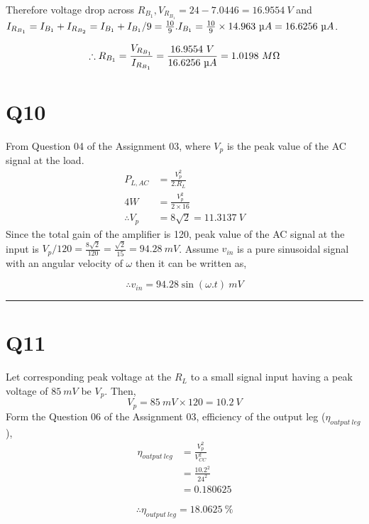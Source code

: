 \documentclass[legalpaper,11pt]{article}%
\begin{document}
Therefore voltage drop across $R_{B_1}, V_{R_{B_1}} = 24- 7.0446 = 16.9554~V$ and
 $I_{R_{B_1}} = I_{B_1}+I_{R_{B_2}} = I_{B_1}+I_{B_1}/9 = \frac{10}{9}.I_{B_1} = \frac{10}{9}\times14.963 ~\micro A = 16.6256~\micro A$.

\[\therefore R_{B_1} = \frac{V_{R_{B_1}}}{I_{R_{B_1}}} = \frac{16.9554~V}{16.6256~\micro A} =1.0198 ~M\Omega \]%


\section*{Q10}

From Question 04 of the Assignment 03, where $V_p$ is the peak value of the AC signal at the load.
\[
\begin{split}
	P_{L,AC} & =  \frac{V_p^2}{2.R_L}\\
	4 W & = \frac{V_p^2}{2\times 16}\\	
	\therefore V_p& = 8\sqrt{2} = 11.3137~ V
\end{split}
\]
Since the total gain of the amplifier is 120, peak value of the AC signal at the input is $V_p/120 = \frac{8\sqrt{2}}{120} = \frac{\sqrt{2}}{15} = 94.28~mV$. Assume $v_{in}$ is a pure sinusoidal signal with an angular velocity of $\omega$ then it can be written as,

\[ \therefore v_{in} = 94.28\sin\left(\omega.t\right)~mV \]

\hrule
\section*{Q11}
Let corresponding peak voltage at the $R_L$ to a small signal input having a peak voltage of $85 ~mV$ be $V_p$. Then, 
\[ V_p = 85~mV \times 120 = 10.2 ~V\]
Form the  Question 06 of the Assignment 03,  efficiency of the output leg  ($\eta_{output~leg}$),
\[
\begin{split}
	\eta_{output~leg} & = \frac{V_p^2}{V_{CC}^2}\\
	& = \frac{10.2^2}{24^2}\\
	&= 0.180625
\end{split}
\]

\[\therefore \eta_{output~leg} = 18.0625~\% \]
\end{document}
